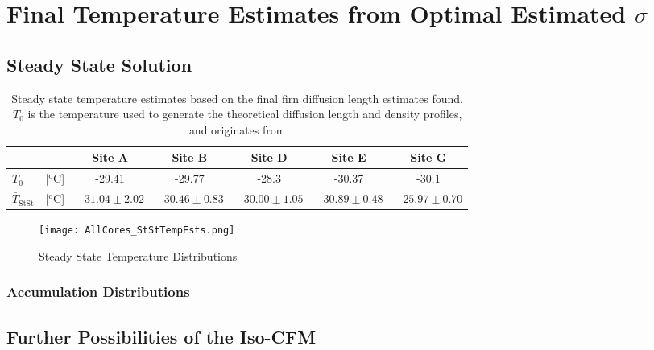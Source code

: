 \documentclass[../../CompleteThesis2/Complete_2ndDraft]{subfiles}
\begin{document}
\section[Temperature Estimates from Data]{Final Temperature Estimates from Optimal Estimated $\sigma$}
\label{Sec:Results_TempEstData}


\subsection[Steady State Solution]{Steady State Solution}
\label{Sec:Results_TempEstData_StSt}

\begin{table}[ht]
	\centering
	\begin{tabular}{l c|c|c|c|c|c}
		& & Site A & Site B & Site D & Site E & Site G \\
		\hline
		\hline
		$T_0$ & [$^{\text{o}}$C] & -29.41 & -29.77 & -28.3 & -30.37 & -30.1 \\
		$\bar{T}_{\text{StSt}}$ & [$^{\text{o}}$C] & $-31.04 \pm 2.02$ & $-30.46 \pm 0.83$ & $-30.00 \pm 1.05$ & $-30.89 \pm 0.48$ & $-25.97 \pm 0.70$ \\
	\end{tabular}
	\caption[Steady State Temperature Estimates]{\small Steady state temperature estimates based on the final firn diffusion length estimates found. $T_0$ is the temperature used to generate the theoretical diffusion length and density profiles, and originates from \cite[add. text]{keylist}}
\end{table}

\begin{figure}[h]
	\centering
	\texttt{[image: AllCores\_StStTempEsts.png]}
	\caption[Steady State Temperature Distributions]{\small Steady State Temperature Distributions}
	\label{fig:AllCores_StStTempEsts}
\end{figure}



\subsubsection[Accumulation Distributions]{Accumulation Distributions}
\label{Sec:Results_TempEstData_StSt_AccumDists}

\subsection[Iso-CFM Possibilities]{Further Possibilities of the Iso-CFM}
\label{Sec:Results_TempEstData_IsoCFMPossibilities}
\end{document}
